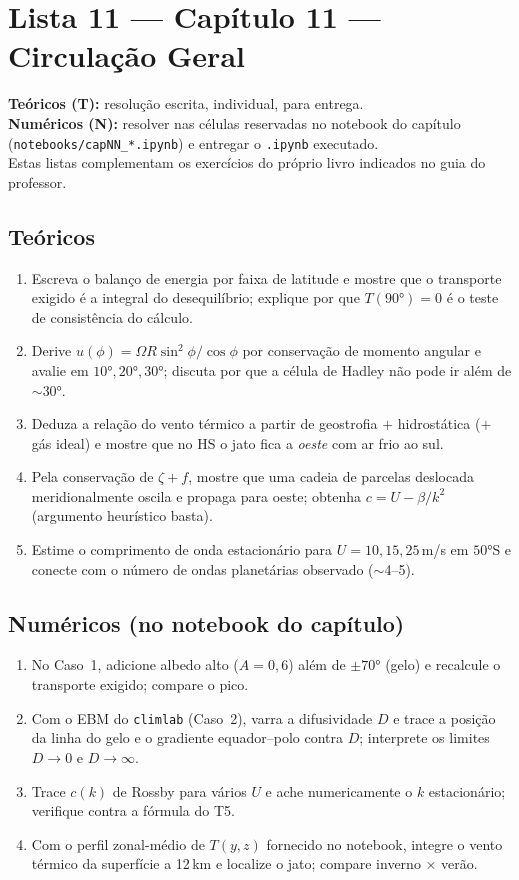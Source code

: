 \documentclass[11pt]{article}
\newcommand{\instrucoes}{%
\begin{caixalista}
\textbf{Teóricos (T):} resolução escrita, individual, para entrega.\\
\textbf{Numéricos (N):} resolver nas células reservadas no notebook do
capítulo (\texttt{notebooks/capNN\_*.ipynb}) e entregar o
\texttt{.ipynb} executado.\\
Estas listas complementam os exercícios do próprio livro indicados no
guia do professor.
\end{caixalista}}
\begin{document}
\clearpage
\section*{Lista 11 --- Capítulo 11 --- Circulação Geral}
\instrucoes

\subsection*{Teóricos}

\begin{enumerate}[label=\textbf{T\arabic*.},itemsep=4pt]
  \item Escreva o balanço de energia por faixa de latitude e mostre que
        o transporte exigido é a integral do desequilíbrio; explique por
        que $T(90°) = 0$ é o teste de consistência do cálculo.
  \item Derive $u(\phi) = \Omega R\sin^2\phi/\cos\phi$ por conservação
        de momento angular e avalie em $10°, 20°, 30°$; discuta por que
        a célula de Hadley não pode ir além de $\sim$30°.
  \item Deduza a relação do vento térmico a partir de geostrofia $+$
        hidrostática ($+$ gás ideal) e mostre que no HS o jato fica a
        \emph{oeste} com ar frio ao sul.
  \item Pela conservação de $\zeta + f$, mostre que uma cadeia de
        parcelas deslocada meridionalmente oscila e propaga para oeste;
        obtenha $c = U - \beta/k^2$ (argumento heurístico basta).
  \item Estime o comprimento de onda estacionário para $U = 10, 15,
        25$\,m/s em $50°$S e conecte com o número de ondas planetárias
        observado ($\sim$4--5).
\end{enumerate}

\subsection*{Numéricos (no notebook do capítulo)}

\begin{enumerate}[label=\textbf{N\arabic*.},itemsep=4pt]
  \item No Caso~1, adicione albedo alto ($A = 0{,}6$) além de $\pm70°$
        (gelo) e recalcule o transporte exigido; compare o pico.
  \item Com o EBM do \texttt{climlab} (Caso~2), varra a difusividade $D$
        e trace a posição da linha do gelo e o gradiente equador--polo
        contra $D$; interprete os limites $D\to0$ e $D\to\infty$.
  \item Trace $c(k)$ de Rossby para vários $U$ e ache numericamente o
        $k$ estacionário; verifique contra a fórmula do T5.
  \item Com o perfil zonal-médio de $T(y, z)$ fornecido no notebook,
        integre o vento térmico da superfície a 12\,km e localize o
        jato; compare inverno × verão.
\end{enumerate}
\end{document}
